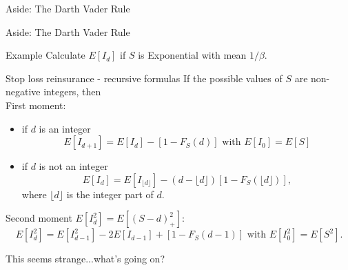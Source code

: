 \documentclass[11pt]{beamer}
\begin{document}
\begin{frame}{Aside: The Darth Vader Rule}

\end{frame}
\begin{frame}{Aside: The Darth Vader Rule}

\end{frame}
\begin{frame}[t]{Example}
  Calculate $E[I_d]$ if $S$ is Exponential with mean $1/\beta$.


\end{frame}
\begin{frame}{Stop loss reinsurance - recursive formulas }
  If the possible values of $S$
  are non-negative integers, then\\

  First moment:
  \begin{itemize}
  \item if $d$ is an integer
    $$E[I_{d+1}]=E[I_d]-[1-F_S(d)]\text{ with }E[I_0]=E[S]$$
  \item if $d$ is not an integer
    $$E[I_d]=E[I_{\lfloor d \rfloor}]-(d-\lfloor d \rfloor)[1-F_S(\lfloor d \rfloor)],$$
    where $\lfloor d \rfloor$ is the integer part of $d$.
  \end{itemize}
  Second moment $E[I_d^2]=E[(S-d)_+^2]$:
  $$E[I_d^2]=E[I_{d-1}^2]-2E[I_{d-1}]+[1-F_S(d-1)]\text{ with }E[I_0^2]=E[S^2].$$
\end{frame}
\begin{frame}{This seems strange...what's going on?}

\end{frame}
\end{document}
